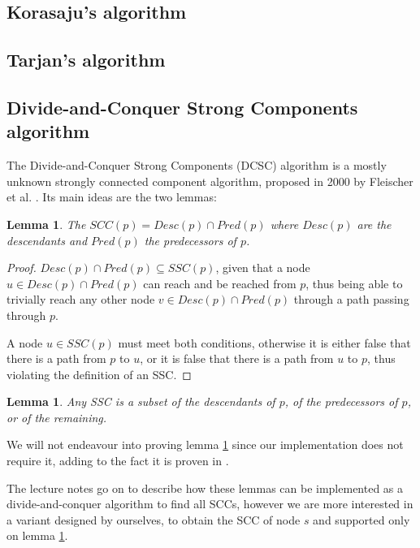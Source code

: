 \documentclass{report}[a4paper]
\newtheorem{lemma}[theorem]{Lemma}
\theoremstyle{remark}
\begin{document}
\subsection{Korasaju's algorithm}
\subsection{Tarjan's algorithm}
\subsection{Divide-and-Conquer Strong Components algorithm}
The Divide-and-Conquer Strong Components (DCSC) algorithm is a mostly unknown strongly connected component algorithm, proposed in 2000 by Fleischer et al. \cite{fleischer-dcsc}. Its main ideas are the two lemmas:
\begin{lemma} \label{lem:dcsc1}
    The $SCC(p)=Desc(p) \cap Pred(p)$ where $Desc(p)$ are the descendants and $Pred(p)$ the predecessors of $p$.
\end{lemma}
\begin{proof}
    $Desc(p) \cap Pred(p) \subseteq SSC(p)$, given that a node $u \in Desc(p) \cap Pred(p)$ can reach and be reached from $p$, thus being able to trivially reach any other node $v \in Desc(p) \cap Pred(p)$ through a path passing through $p$.\par
    A node $u \in SSC(p)$ must meet both conditions, otherwise it is either false that there is a path from $p$ to $u$, or it is false that there is a path from $u$ to $p$, thus violating the definition of an SSC.
\end{proof}
\begin{lemma} \label{lem:dcsc2}
    Any SSC is a subset of the descendants of $p$, of the predecessors of $p$, or of the remaining.
\end{lemma}
We will not endeavour into proving lemma \ref{lem:dcsc2} since our implementation does not require it, adding to the fact it is proven in \cite{fleischer-dcsc}.\par
The lecture notes go on to describe how these lemmas can be implemented as a divide-and-conquer algorithm to find all SCCs, however we are more interested in a variant designed by ourselves, to obtain the SCC of node $s$ and supported only on lemma \ref{lem:dcsc1}.
\end{document}
